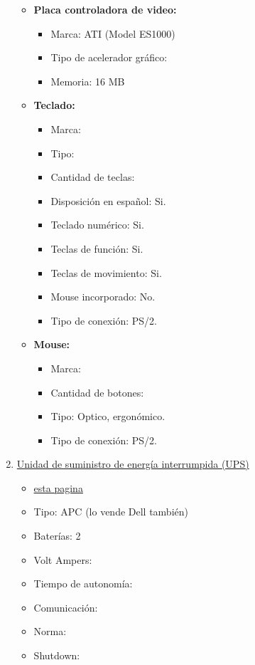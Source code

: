 \begin{enumerate}
\begin{itemize}
    \item \textbf{Placa controladora de video:}
    \begin{itemize}
      \item Marca: ATI (Model ES1000)
      \item Tipo de acelerador gráfico: 
      \item Memoria: 16 MB
    \end{itemize}
    
    \item \textbf{Teclado:} 
    \begin{itemize}
      \item Marca:
      \item Tipo:
      \item Cantidad de teclas:
      \item Disposición en español: Si.
      \item Teclado numérico: Si.
      \item Teclas de función: Si.
      \item Teclas de movimiento: Si.
      \item Mouse incorporado: No.
      \item Tipo de conexión: PS/2.
    \end{itemize}
    
    \item \textbf{Mouse:} 
    \begin{itemize}
      \item Marca:
      \item Cantidad de botones:
      \item Tipo: Optico, ergonómico.
      \item Tipo de conexión: PS/2.
    \end{itemize}
  \end{itemize}
  
  \item \underline{Unidad de suministro de energía interrumpida (UPS)}
  \begin{itemize}
    \item {} \href{http://accessories.us.dell.com/sna/productdetail.aspx?c=us&l=en&s=bsd&cs=04&sku=A0973336}{esta pagina}
    \item Tipo: APC (lo vende Dell también)
    \item Baterías: 2
    \item Volt Ampers:
    \item Tiempo de autonomía:
    \item Comunicación:
    \item Norma:
    \item Shutdown:
  \end{itemize}
      
\end{enumerate}
